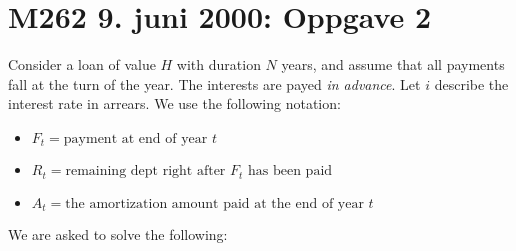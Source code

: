 \documentclass[a4paper,colorinlistoftodos, 10pt]{article}
\begin{document}
\section*{M262 9. juni 2000: Oppgave 2}
Consider a loan of value $H$ with duration $N$ years, and assume that all payments fall at the turn of the year. The interests are payed \emph{in advance}. Let $i$ describe the interest rate in arrears. We use the following notation:
\begin{itemize}
\item $F_t = \text{payment at end of year } t$
\item $R_t = \text{remaining dept right after $F_t$ has been paid}$
\item $A_t = \text{the amortization amount paid at the end of year } t$
\end{itemize}
We are asked to solve the following:
\end{document}
